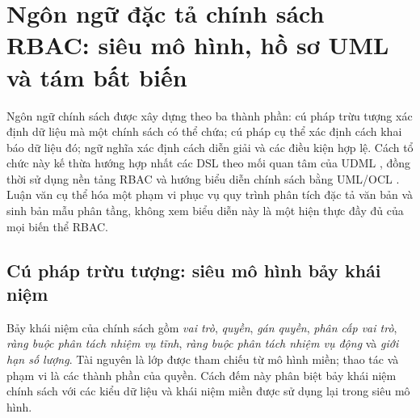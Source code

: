 \section{Ngôn ngữ đặc tả chính sách RBAC: siêu mô hình, hồ sơ UML và tám bất biến}
\label{sec:dsl-rbac}

Ngôn ngữ chính sách được xây dựng theo ba thành phần: cú pháp trừu tượng xác định dữ liệu mà một chính sách có thể chứa; cú pháp cụ thể xác định cách khai báo dữ liệu đó; ngữ nghĩa xác định cách diễn giải và các điều kiện hợp lệ. Cách tổ chức này kế thừa hướng hợp nhất các DSL theo mối quan tâm của UDML \citep{le2025udml}, đồng thời sử dụng nền tảng RBAC và hướng biểu diễn chính sách bằng UML/OCL \citep{sandhu1996,ray2004,sohr2008}. Luận văn cụ thể hóa một phạm vi phục vụ quy trình phân tích đặc tả văn bản và sinh bản mẫu phân tầng, không xem biểu diễn này là một hiện thực đầy đủ của mọi biến thể RBAC.

\subsection{Cú pháp trừu tượng: siêu mô hình bảy khái niệm}
\label{subsec:cu-phap-truu-tuong}

Bảy khái niệm của chính sách gồm \emph{vai trò}, \emph{quyền}, \emph{gán quyền}, \emph{phân cấp vai trò}, \emph{ràng buộc phân tách nhiệm vụ tĩnh}, \emph{ràng buộc phân tách nhiệm vụ động} và \emph{giới hạn số lượng}. Tài nguyên là lớp được tham chiếu từ mô hình miền; thao tác và phạm vi là các thành phần của quyền. Cách đếm này phân biệt bảy khái niệm chính sách với các kiểu dữ liệu và khái niệm miền được sử dụng lại trong siêu mô hình.

